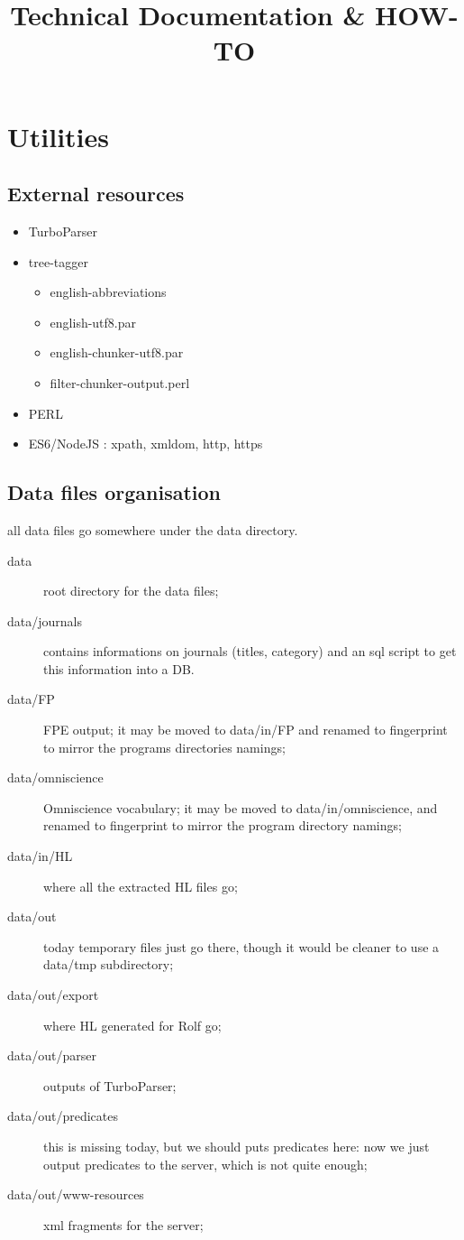 \documentclass[a4paper,11pt]{report}
\title{Technical Documentation \& HOW-TO}
\begin{document}
\maketitle
\tableofcontents
\chapter{Utilities}
\section{External resources}
\begin{itemize}
\item TurboParser
\item tree-tagger
  \begin{itemize}
  \item english-abbreviations
  \item english-utf8.par
  \item english-chunker-utf8.par
  \item filter-chunker-output.perl
  \end{itemize}
\item PERL
\item ES6/NodeJS : xpath, xmldom, http, https
\end{itemize}
\section{Data files organisation}
all data files go somewhere under the data directory.
\begin{description}
\item[data] root directory for the data files;
\item[data/journals] contains informations on journals (titles, category) and an sql script to get this information into a DB.
\item[data/FP] FPE output; it may be moved to data/in/FP and renamed to fingerprint to mirror the programs directories namings;
\item[data/omniscience] Omniscience vocabulary; it may be moved to data/in/omniscience, and renamed to fingerprint to mirror the program directory namings;
\item[data/in/HL] where all the extracted HL files go;
\item[data/out] today temporary files just go there, though it would be cleaner to use a data/tmp subdirectory;
\item[data/out/export] where HL generated for Rolf go;
\item[data/out/parser] outputs of TurboParser;
\item[data/out/predicates] this is missing today, but we should puts predicates here: now we just output predicates to the server, which is not quite enough;
  \item[data/out/www-resources] xml fragments for the server;
\end{description}
\end{document}
